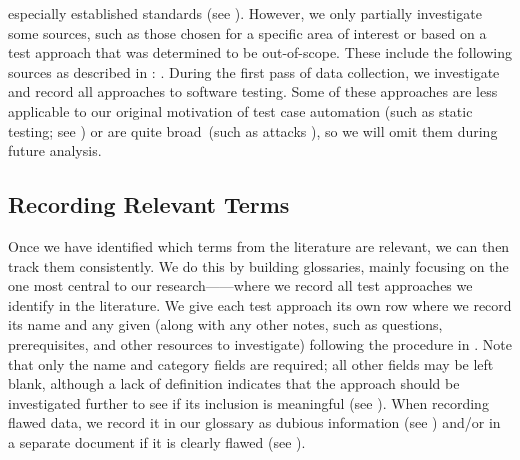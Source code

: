 especially established standards (see ). However, we only partially
investigate some sources, such as those chosen for a specific area of
interest or based on a test approach that was determined to be out-of-scope.
These include the following sources as described in :
\citet{ISO2022,ISO2015,Dominguez-PumarEtAl2020,PierreEtAl2017,
    TrudnowskiEtAl2017,YuEtAl2011,Tsui2007,Goralski1999}.
During the first pass of data collection, we investigate and record all
approaches to software testing. Some of these approaches are less
applicable to our original motivation of test case automation \ifnotpaper
    (such as static testing; see ) \fi or
are quite broad\ifnotpaper\ (such as attacks%
    )\fi, so we will omit them during future analysis.

\subsection{Recording Relevant Terms}\label{record-terms}

\ifnotpaper
    
\fi

Once we have identified which terms from the literature are relevant, we can
then track them consistently. We do this by building glossaries, mainly
focusing on the one most central to our research---\ourApproachGlossary{}---where
we record all test approaches we identify in the literature. We give each test
approach its own row where we record its name and any given \approachFields{}
(along with any other notes, such as questions, prerequisites, and other
resources to investigate) following the procedure in .
Note that only the name and category fields are required; all other fields
may be left blank, although a lack of definition indicates that the approach
should be investigated further to see if its inclusion is meaningful (see
). When recording flawed data, we record it in our glossary as
dubious information (see )
and/or in a separate document if it is clearly flawed (see ).

